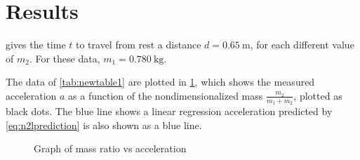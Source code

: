 ﻿\documentclass[reprint,amsmath,amssymb,aps]{revtex4-2}
\begin{document}
\section{Results}
 gives the time $t$ to travel from rest a distance $d=\qty{0.65}{\meter}$, for each different value of $m_2$. For these data, $m_1=\qty{0.780}{\kilo\gram}$. 


The data of \cref{tab:newtable1} are plotted in \cref{fig:graph}, which shows the measured acceleration $a$ as a function of the nondimensionalized mass $\frac{m_2}{m_1+m_2}$, plotted as black dots. The blue line shows a linear regression acceleration predicted by \cref{eq:n2lprediction} is also shown as a blue line. 
\begin{figure}
\begin{center}

\end{center}
\caption{\label{fig:graph} Graph of mass ratio vs acceleration}  
\end{figure}
\end{document}
